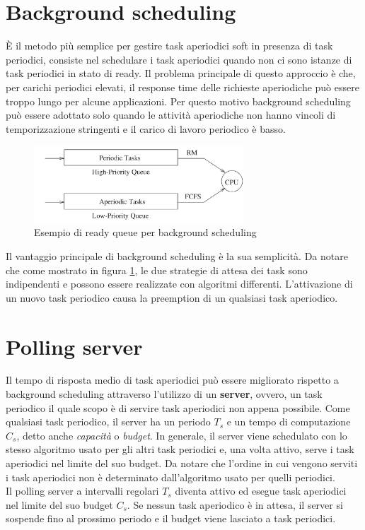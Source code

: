 \documentclass[12pt,openany,onesided]{book}
\begin{document}
\section{Background scheduling}
\label{sec:backgroundScheduling}
È il metodo più semplice per gestire task aperiodici soft in presenza di task periodici, consiste nel schedulare i task aperiodici quando non ci sono istanze di task periodici in stato di ready.
Il problema principale di questo approccio è che, per carichi periodici elevati, il response time delle richieste aperiodiche può essere troppo lungo per alcune applicazioni.
Per questo motivo background scheduling può essere adottato solo quando le attività aperiodiche non hanno vincoli di temporizzazione stringenti e il carico di lavoro periodico è basso.
\begin{figure}[H]
    \centering
    \includegraphics[width=0.7\textwidth]{pictures/backgroundScheduling.png}
    \caption{Esempio di ready queue per background scheduling}  
    \label{fig:backgroundScheduling}
\end{figure}
\noindent
Il vantaggio principale di background scheduling è la sua semplicità.
Da notare che come mostrato in figura \ref{fig:backgroundScheduling}, le due strategie di attesa dei task sono indipendenti e possono essere realizzate con algoritmi differenti.
L'attivazione di un nuovo task periodico causa la preemption di un qualsiasi task aperiodico.

\section{Polling server}
\label{sec:pollingServer}
Il tempo di risposta medio di task aperiodici può essere migliorato rispetto a background scheduling attraverso l'utilizzo di un \textbf{server}, ovvero, un task periodico il quale scopo è di servire task aperiodici non appena possibile.
Come qualsiasi task periodico, il server ha un periodo $T_s$ e un tempo di computazione $C_s$, detto anche \textit{capacità} o \textit{budget}.
In generale, il server viene schedulato con lo stesso algoritmo usato per gli altri task periodici e, una volta attivo, serve i task aperiodici nel limite del suo budget.
Da notare che l'ordine in cui vengono serviti i task aperiodici non è determinato dall'algoritmo usato per quelli periodici.
\\
Il polling server a intervalli regolari $T_s$  diventa attivo ed esegue task aperiodici nel limite del suo budget $C_s$.
Se nessun task aperiodico è in attesa, il server si sospende fino al prossimo periodo e il budget viene lasciato a task periodici.
\end{document}
